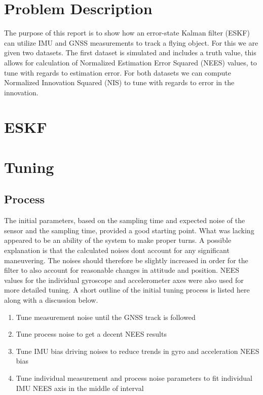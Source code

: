 \section{Problem Description}\label{sec:prob_descr}

The purpose of this report is to show how an error-state Kalman filter (ESKF)
can utilize IMU and GNSS measurements to track a flying object. 
For this we are given two datasets.
The first dataset is simulated and includes a truth value,
this allows for calculation of Normalized Estimation Error Squared (NEES) values,
to tune with regards to estimation error.
For both datasets we can compute Normalized Innovation Squared (NIS) to tune 
with regards to error in the innovation.

\section{ESKF}\label{sec:eskf}



\section{Tuning}\label{sec:tuning}

\subsection{Process}

The initial parameters, based on the sampling time and expected 
noise of the sensor and the sampling time, provided a good starting point.
What was lacking appeared to be an ability of the system to make proper turns.
A possible explanation is that the calculated noises dont account for
any significant maneuvering. 
The noises should therefore be slightly increased in order for the filter
to also account for reasonable changes in attitude and position.
NEES values for the individual gyroscope and accelerometer axes 
were also used for more detailed tuning.
A short outline of the initial tuning process is listed here along with a discussion below.

\begin{enumerate}
	\item Tune measurement noise until the GNSS track is followed
	\item Tune process noise to get a decent NEES results
	\item Tune IMU bias driving noises to reduce trends in gyro and acceleration NEES bias
	\item Tune individual measurement and process noise parameters to fit individual IMU NEES axis in the middle of interval
\end{enumerate}

